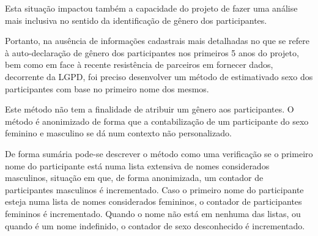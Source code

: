 \documentclass[
12pt,		%
openright,	%
twoside,  %
a4paper,			%
chapter=TITLE,		%
english,			%
french,				%
spanish,			%
brazil				%
]{USPSC-classe/USPSC}
\begin{document}
Esta situa\c{c}\~ao impactou tamb\'em a capacidade do projeto de fazer uma an\'alise mais inclusiva no sentido da identifica\c{c}\~ao de g\^enero dos participantes.














Portanto, na aus\^encia de informa\c{c}\~oes cadastrais mais detalhadas no que se refere \`a auto-declara\c{c}\~ao de g\^enero dos participantes nos primeiros 5 anos do projeto, bem como em face \`a recente resist\^encia de parceiros em fornecer dados, decorrente da LGPD, foi preciso desenvolver um m\'etodo de \textquotedbl estimativa\textquotedbl  do sexo dos participantes com base no primeiro nome dos mesmos.














Este m\'etodo n\~ao tem a finalidade de atribuir um g\^enero aos participantes. O m\'etodo \'e anonimizado de forma que a contabiliza\c{c}\~ao de um participante do sexo feminino e masculino se d\'a num contexto n\~ao personalizado.














De forma sum\'aria pode-se descrever o m\'etodo como uma verifica\c{c}\~ao se o primeiro nome do participante est\'a numa lista extensiva de nomes \textquotedbl considerados masculinos\textquotedbl , situa\c{c}\~ao em que, de forma anonimizada, um contador de participantes masculinos \'e incrementado. Caso o primeiro nome do participante esteja numa lista de nomes \textquotedbl considerados femininos\textquotedbl , o contador de participantes femininos \'e incrementado. Quando o nome n\~ao est\'a em nenhuma das listas, ou quando \'e um nome indefinido, o contador de \textquotedbl sexo desconhecido \'e incrementado\textquotedbl .
\end{document}
